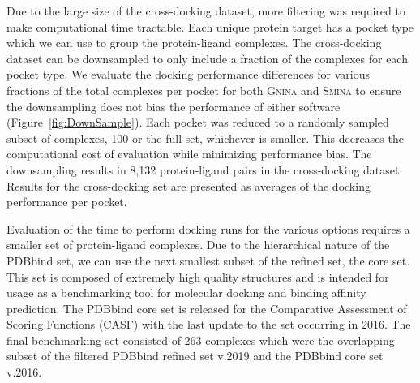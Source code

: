 \documentclass[journal=jcisd8,manuscript=article]{achemso}
\begin{document}
Due to the large size of the cross-docking dataset, more filtering was required to make computational time tractable. Each unique protein target has a pocket type which we can use to group the protein-ligand complexes. The cross-docking dataset can be downsampled to only include a fraction of the complexes for each pocket type. We evaluate the docking performance differences for various fractions of the total complexes per pocket for both \textsc{Gnina} and \textsc{Smina} to ensure the downsampling does not bias the performance of either software (Figure~\ref{fig:DownSample}). Each pocket was reduced to a randomly sampled subset of complexes, 100 or the full set, whichever is smaller. This decreases the computational cost of evaluation while minimizing performance bias. The downsampling results in 8,132 protein-ligand pairs in the cross-docking dataset. Results for the cross-docking set are presented as averages of the docking performance per pocket.

Evaluation of the time to perform docking runs for the various options requires a smaller set of protein-ligand complexes. Due to the hierarchical nature of the PDBbind set, we can use the next smallest subset of the refined set, the core set. This set is composed of extremely high quality structures and is intended for usage as a benchmarking tool for molecular docking and binding affinity prediction. The PDBbind core set is released for the Comparative Assessment of Scoring Functions (CASF) with the last update to the set occurring in 2016\cite{su2018comparative}. The final benchmarking set consisted of 263 complexes which were the overlapping subset of the filtered PDBbind refined set v.2019 and the PDBbind core set v.2016.
\end{document}
